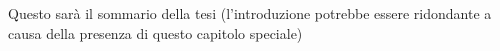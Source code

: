 \sommario
Questo sarà il sommario della tesi (l'introduzione potrebbe essere ridondante a causa della presenza di questo capitolo speciale)

\endinput